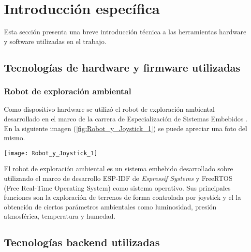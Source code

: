 \chapter{Introducción específica} %

\label{Chapter2}



Esta sección presenta una breve introducción técnica a las herramientas hardware y software utilizadas en el trabajo.

\section{Tecnologías de hardware y firmware utilizadas}


\subsection{Robot de exploración ambiental}

Como dispositivo hardware se utilizó el robot de exploración ambiental desarrollado en el marco de la carrera de Especialización de Sistemas Embebidos \citep{cese_gonzalo_memoria}. En la siguiente imagen (\ref{fig:Robot_y_Joystick_1}) se puede apreciar una foto del mismo.


\begin{center}
   \texttt{[image: Robot\_y\_Joystick\_1]}
   \label{fig:Robot_y_Joystick_1}
\end{center}

El robot de exploración ambiental es un sistema embebido desarrollado sobre \cite{ESP32} utilizando el marco de desarrollo ESP-IDF \cite{ESPIDF_home} de \textit{Espressif Systems} y FreeRTOS (Free Real-Time Operating System) \citep{FreeRTOS} como sistema operativo. Sus principales funciones son la exploración de terrenos de forma controlada por joystick y el la obtención de ciertos parámetros ambientales como luminosidad, presión atmosférica, temperatura y humedad.



\section{Tecnologías backend utilizadas}


